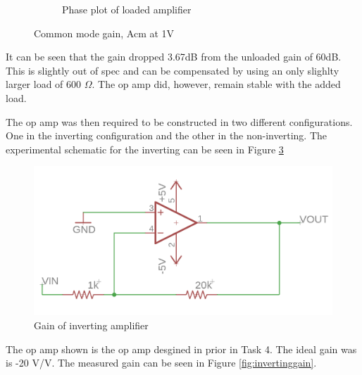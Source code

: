 \begin{figure}[H]
\begin{subfigure}[b]{0.45\textwidth}
		\caption{Phase plot of loaded amplifier}
		\label{fig:phasewithload}
		\end{subfigure}
		\caption{Common mode gain, Acm at 1V}
		\label{fig:gainwithload}
	\end{figure} 
	
It can be seen that the gain dropped 3.67dB from the unloaded gain of 60dB. This is slightly out of spec and can be compensated by using an only slighlty larger load of 600 $\Omega$. The op amp did, however, remain stable with the added load.
	
	
	
The op amp was then required to be constructed in two different configurations. One in the inverting configuration and the other in the non-inverting. The experimental schematic for the inverting can be seen in Figure \ref{fig:invertingschem}

		\begin{figure}[H]
	\begin{center}
		\includegraphics[scale=.40]{ExperimentalImplementation/invertingschem.png}
		\caption{Gain of inverting amplifier}
		\label{fig:invertingschem}
	\end{center}
\end{figure}

The op amp shown is the op amp desgined in prior in Task 4. The ideal gain was is -20 V/V. The measured gain can be seen in Figure \ref{fig:invertinggain}.
	
	
	
